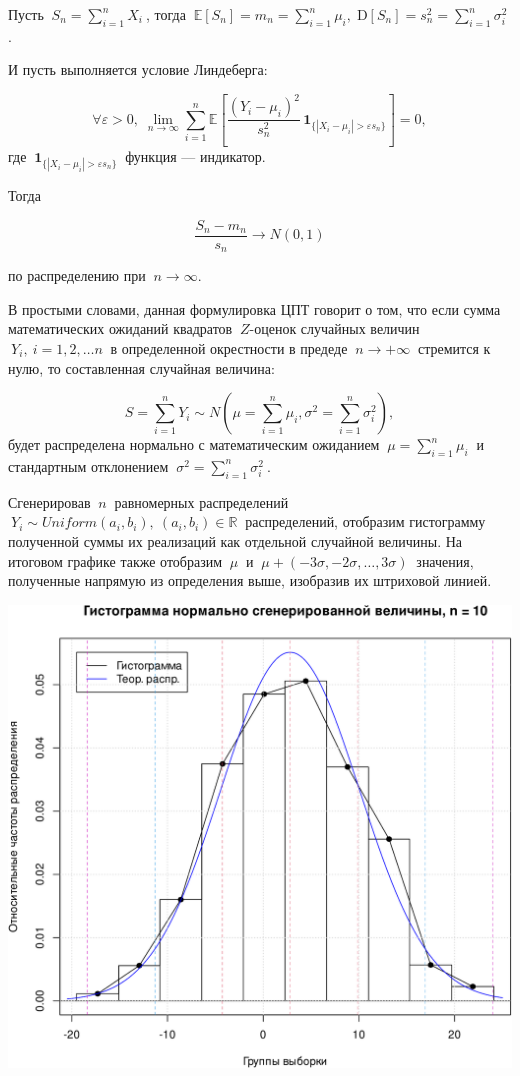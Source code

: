 \documentclass[
]{article}
\begin{document}
Пусть \(\ S_{n}=\sum \limits _{i=1}^{n}X_{i}\ \), тогда
\(\ {\mathbb {E}}[S_{n}]=m_{n}=\sum \limits_{{i=1}}^{n}\mu_{i},\;{\mathrm {D}}[S_{n}]=s_{n}^{2}=\sum \limits_{{i=1}}^{n}\sigma _{i}^{2}\ \).

И пусть выполняется условие Линдеберга:

\[
\forall \varepsilon >0,\;\lim \limits _{{n\to \infty }}\sum \limits _{{i=1}}^{n}{\mathbb {E}}\left[{\frac {(Y_{i}-\mu _{i})^{2}}{s_{n}^{2}}}\,{\mathbf {1}}_{{\{|X_{i}-\mu _{i}|>\varepsilon s_{n}\}}}\right]=0,
\] где \(\ {\mathbf {1}}_{{\{|X_{i}-\mu _{i}|>\varepsilon s_{n}\}}}\ \)
функция --- индикатор.

Тогда

\[
{\frac {S_{n}-m_{n}}{s_{n}}}\to N(0,1)
\]

по распределению при \(\ n\to \infty\).

В простыми словами, данная формулировка ЦПТ говорит о том, что если
сумма математических ожиданий квадратов \(\ Z\)-оценок случайных величин
\(\ Y_i, \ i=1,2,\dots n\ \) в определенной окрестности в предеде
\(\ n \to +\infty\ \) стремится к нулю, то составленная случайная
величина:

\[
S = \sum_{i=1}^{n} Y_i \sim N\left(\mu =\sum_{i=1}^n \mu_i, \sigma^2 = \sum_{i=1}^{n} \sigma_i^2\right),
\] будет распределена нормально с математическим ожиданием
\(\ \mu = \sum_{i=1}^n \mu_i\ \) и стандартным отклонением
\(\ \sigma^2 = \sum_{i=1}^{n} \sigma_i^2\ \).

Сгенерировав \(\ n\ \) равномерных распределений
\(\ Y_i \sim Uniform(a_i, b_i), \ (a_i, b_i) \in \mathbb{R}\ \)
распределений, отобразим гистограмму полученной суммы их реализаций как
отдельной случайной величины. На итоговом графике также отобразим
\(\ \mu\ \) и \(\ \mu + (-3\sigma, -2\sigma, \dots, 3\sigma)\ \)
значения, полученные напрямую из определения выше, изобразив их
штриховой линией.

\begin{center}\includegraphics[width=0.6\linewidth]{Prac4_files/figure-latex/unnamed-chunk-3-1} \end{center}
\end{document}
